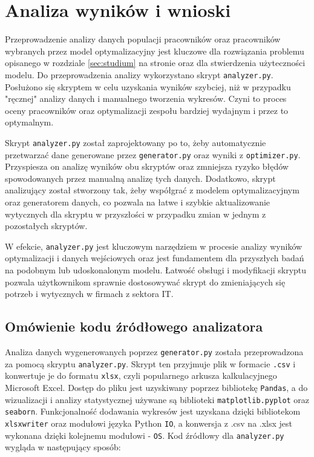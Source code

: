 \section{Analiza wyników i wnioski}\label{sec:analiza}
\par Przeprowadzenie analizy danych populacji pracowników oraz pracowników wybranych przez model optymalizacyjny jest kluczowe dla rozwiązania problemu opisanego w rozdziale \ref{sec:studium} na stronie \pageref{sec:studium} oraz dla stwierdzenia użyteczności modelu. Do przeprowadzenia analizy wykorzystano skrypt \verb|analyzer.py|. Posłużono się skryptem w celu uzyskania wyników szybciej, niż w przypadku "ręcznej" analizy danych i manualnego tworzenia wykresów. Czyni to proces oceny pracowników oraz optymalizacji zespołu bardziej wydajnym i przez to optymalnym.

\par Skrypt \verb|analyzer.py| został zaprojektowany po to, żeby automatycznie przetwarzać dane generowane przez \verb|generator.py| oraz wyniki z \verb|optimizer.py|. Przyspiesza on analizę wyników obu skryptów oraz zmniejsza ryzyko błędów spowodowanych przez manualną analizę tych danych. Dodatkowo, skrypt analizujący został stworzony tak, żeby współgrać z modelem optymalizacyjnym oraz generatorem danych, co pozwala na łatwe i szybkie aktualizowanie wytycznych dla skryptu w przyszłości w przypadku zmian w jednym z pozostałych skryptów. 

\par W efekcie, \verb|analyzer.py| jest kluczowym narzędziem w procesie analizy wyników optymalizacji i danych wejściowych oraz jest fundamentem dla przyszłych badań na podobnym lub udoskonalonym modelu. Łatwość obsługi i modyfikacji skryptu pozwala użytkownikom sprawnie dostosowywać skrypt do zmieniających się potrzeb i wytycznych w firmach z sektora IT.

    \subsection{Omówienie kodu źródłowego analizatora}\label{sec:analyzer}
        \par Analiza danych wygenerowanych poprzez \verb|generator.py| została przeprowadzona za pomocą skryptu \verb|analyzer.py|. Skrypt ten przyjmuje plik w formacie \verb|.csv| i konwertuje je do formatu \verb|xlsx|, czyli popularnego arkusza kalkulacyjnego Microsoft Excel. Dostęp do pliku jest uzyskiwany poprzez bibliotekę \verb|Pandas|, a do wizualizacji i analizy statystycznej używane są biblioteki \verb|matplotlib.pyplot| oraz \verb|seaborn|. Funkcjonalność dodawania wykresów jest uzyskana dzięki bibliotekom \verb|xlsxwriter| oraz modułowi języka Python \verb|IO|, a konwersja z .csv na .xlsx jest wykonana dzięki kolejnemu modułowi - \verb|OS|. Kod źródłowy dla \verb|analyzer.py| wygląda w następujący sposób:

